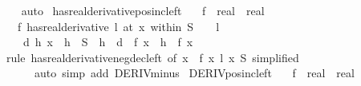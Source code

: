 \begin{isabellebody}
\ \ \isamarkupfalse%
\ auto%
\endisatagproof
{\isafoldproof}%
%
\isadelimproof
\isanewline
%
\endisadelimproof
\isanewline
{}\isamarkupfalse%
\ has{\isacharunderscore}{\kern0pt}real{\isacharunderscore}{\kern0pt}derivative{\isacharunderscore}{\kern0pt}pos{\isacharunderscore}{\kern0pt}inc{\isacharunderscore}{\kern0pt}left{\isacharcolon}{\kern0pt}\isanewline
\ \ \ f\ {\isacharcolon}{\kern0pt}{\isacharcolon}{\kern0pt}\ {\isachardoublequoteopen}real\ {\isasymRightarrow}\ real{\isachardoublequoteclose}\isanewline
\ \ \ {\isachardoublequoteopen}{\isacharparenleft}{\kern0pt}f\ has{\isacharunderscore}{\kern0pt}real{\isacharunderscore}{\kern0pt}derivative\ l{\isacharparenright}{\kern0pt}\ {\isacharparenleft}{\kern0pt}at\ x\ within\ S{\isacharparenright}{\kern0pt}\ {\isasymLongrightarrow}\ {}\ {\isacharless}{\kern0pt}\ l\ {\isasymLongrightarrow}\isanewline
\ \ \ \ {\isasymexists}d{\isachargreater}{\kern0pt}{}{\isachardot}{\kern0pt}\ {\isasymforall}h{\isachargreater}{\kern0pt}{}{\isachardot}{\kern0pt}\ x\ {\isacharminus}{\kern0pt}\ h\ {\isasymin}\ S\ {\isasymlongrightarrow}\ h\ {\isacharless}{\kern0pt}\ d\ {\isasymlongrightarrow}\ f\ {\isacharparenleft}{\kern0pt}x\ {\isacharminus}{\kern0pt}\ h{\isacharparenright}{\kern0pt}\ {\isacharless}{\kern0pt}\ f\ x{\isachardoublequoteclose}\isanewline
%
\isadelimproof
\ \ %
\endisadelimproof
%
\isatagproof
{}\isamarkupfalse%
\ {\isacharparenleft}{\kern0pt}rule\ has{\isacharunderscore}{\kern0pt}real{\isacharunderscore}{\kern0pt}derivative{\isacharunderscore}{\kern0pt}neg{\isacharunderscore}{\kern0pt}dec{\isacharunderscore}{\kern0pt}left\ {\isacharbrackleft}{\kern0pt}of\ {\isachardoublequoteopen}{\isasymlambda}x{\isachardot}{\kern0pt}\ {\isacharminus}{\kern0pt}\ f\ x{\isachardoublequoteclose}\ {\isachardoublequoteopen}{\isacharminus}{\kern0pt}l{\isachardoublequoteclose}\ x\ S{\isacharcomma}{\kern0pt}\ simplified{\isacharbrackright}{\kern0pt}{\isacharparenright}{\kern0pt}\isanewline
\ \ \ \ \ \ {\isacharparenleft}{\kern0pt}auto\ simp\ add{\isacharcolon}{\kern0pt}\ DERIV{\isacharunderscore}{\kern0pt}minus{\isacharparenright}{\kern0pt}%
\endisatagproof
{\isafoldproof}%
%
\isadelimproof
\isanewline
%
\endisadelimproof
\isanewline
{}\isamarkupfalse%
\ DERIV{\isacharunderscore}{\kern0pt}pos{\isacharunderscore}{\kern0pt}inc{\isacharunderscore}{\kern0pt}left{\isacharcolon}{\kern0pt}\isanewline
\ \ \ f\ {\isacharcolon}{\kern0pt}{\isacharcolon}{\kern0pt}\ {\isachardoublequoteopen}real\ {\isasymRightarrow}\ real{\isachardoublequoteclose}\isanewline

\end{isabellebody}
